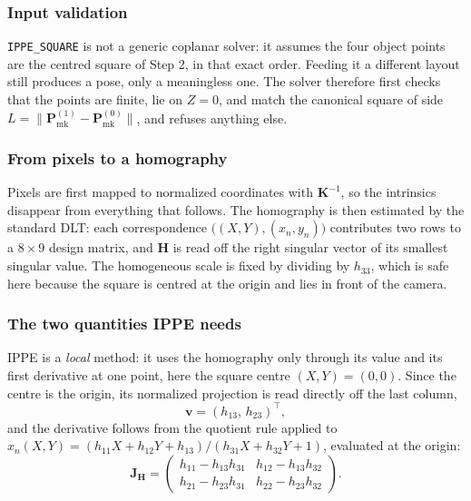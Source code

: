 \documentclass[11pt,a4paper]{article}
\theoremstyle{definition}
\theoremstyle{plain}
\theoremstyle{remark}
\newcommand{\code}[1]{\texttt{#1}}
\newcommand{\Pmark}{\mathbf{P}_{\text{mk}}}
\newcommand{\KK}{\mathbf{K}}
\begin{document}
\subsubsection{Input validation}

\code{IPPE\_SQUARE} is not a generic coplanar solver: it assumes the four
object points are the centred square of Step 2, in that exact order. Feeding it
a different layout still produces a pose, only a meaningless one. The solver
therefore first checks that the points are finite, lie on $Z=0$, and match the
canonical square of side $L = \|\Pmark^{(1)} - \Pmark^{(0)}\|$, and refuses
anything else.

\subsubsection{From pixels to a homography}

Pixels are first mapped to normalized coordinates with $\KK^{-1}$, so the
intrinsics disappear from everything that follows. The homography is then
estimated by the standard DLT: each correspondence $\big((X,Y),(x_n,y_n)\big)$
contributes two rows to a $8\times9$ design matrix, and $\mathbf{H}$ is read off
the right singular vector of its smallest singular value. The homogeneous
scale is fixed by dividing by $h_{33}$, which is safe here because the square is
centred at the origin and lies in front of the camera.

\subsubsection{The two quantities IPPE needs}

IPPE is a \emph{local} method: it uses the homography only through its value
and its first derivative at one point, here the square centre $(X,Y)=(0,0)$.
Since the centre is the origin, its normalized projection is read directly
off the last column,
\begin{equation}
  \mathbf{v} = (h_{13},\, h_{23})^\top ,
\end{equation}
and the derivative follows from the quotient rule applied to
$x_n(X,Y) = (h_{11}X + h_{12}Y + h_{13})/(h_{31}X + h_{32}Y + 1)$, evaluated at
the origin:
\begin{equation}
  \mathbf{J}_{\mathbf H} =
  \begin{pmatrix}
    h_{11} - h_{13}h_{31} & h_{12} - h_{13}h_{32} \\
    h_{21} - h_{23}h_{31} & h_{22} - h_{23}h_{32}
  \end{pmatrix}.
  \label{eq:homography-jacobian}
\end{equation}
\end{document}

